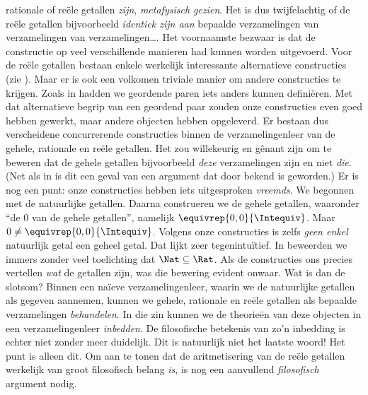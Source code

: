 \documentclass[../../../include/open-logic-section]{subfiles}
\begin{document}
rationale of reële getallen \emph{zijn}, \emph{metafysisch gezien}.
Het is dus twijfelachtig of de reële getallen bijvoorbeeld
\emph{identiek zijn aan} bepaalde verzamelingen van verzamelingen van
verzamelingen\ldots.
Het voornaamste bezwaar is dat de constructie op veel verschillende
manieren had kunnen worden uitgevoerd. Voor de reële getallen bestaan
enkele werkelijk interessante alternatieve constructies (zie
). Maar er is ook een volkomen triviale manier om
andere constructies te krijgen. Zoals in
 hadden we geordende paren iets anders kunnen
definiëren. Met dat alternatieve begrip van een geordend paar zouden
onze constructies even goed hebben gewerkt, maar andere objecten hebben
opgeleverd. Er bestaan dus verscheidene concurrerende constructies
binnen de verzamelingenleer van de gehele, rationale en reële
getallen. Het zou willekeurig en gênant zijn om te beweren dat de
gehele getallen bijvoorbeeld \emph{deze} verzamelingen zijn en niet
\emph{die}. (Net als in  is dit een geval van
een argument dat door \citealt{Benacerraf1965} bekend is geworden.)
Er is nog een punt: onze constructies hebben iets uitgesproken
\emph{vreemds}. We begonnen met de natuurlijke getallen. Daarna
construeren we de gehele getallen, waaronder ``de $0$ van de gehele
getallen'', namelijk $ \equivrep{0,0}{\Intequiv}$. Maar $0 \neq
\equivrep{0,0}{\Intequiv}$. Volgens onze constructies is zelfs
\emph{geen enkel} natuurlijk getal een geheel getal. Dat lijkt zeer
tegenintuïtief. In  beweerden we immers
zonder veel toelichting dat $\Nat \subseteq \Rat$. Als de constructies
ons precies vertellen \emph{wat} de getallen zijn, was die bewering
evident onwaar.
Wat is dan de slotsom? Binnen een na\"ieve verzamelingenleer, waarin we
de natuurlijke getallen als gegeven aannemen, kunnen we gehele,
rationale en reële getallen als bepaalde verzamelingen
\emph{behandelen}. In die zin kunnen we de theorieën van deze objecten
in een verzamelingenleer \emph{inbedden}. De filosofische betekenis van
zo'n inbedding is echter niet zonder meer duidelijk.
Dit is natuurlijk niet het laatste woord!{} Het punt is alleen dit. Om
aan te tonen dat de aritmetisering van de reële getallen werkelijk van
groot filosofisch belang \emph{is}, is nog een aanvullend
\emph{filosofisch} argument nodig.
\end{document}
